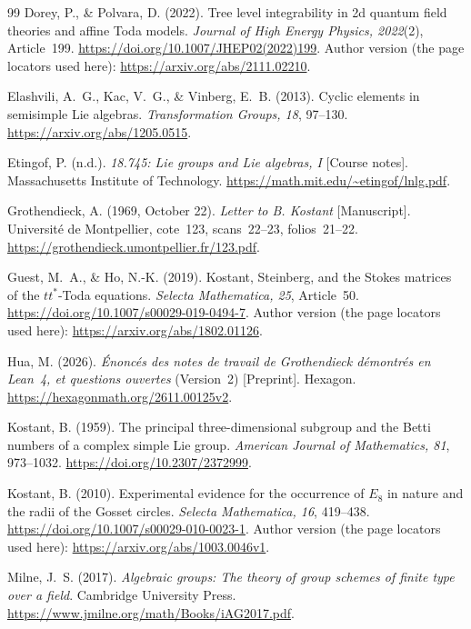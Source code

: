 \documentclass[11pt]{article}
\theoremstyle{definition}\newtheorem{definition}[theorem]{Definition}
\theoremstyle{remark}\newtheorem{remark}[theorem]{Remark}
\begin{document}
\begin{thebibliography}{99}
Dorey, P., \& Polvara, D. (2022). Tree level integrability in 2d quantum field theories and affine Toda models.
\emph{Journal of High Energy Physics, 2022}(2), Article~199.
\url{https://doi.org/10.1007/JHEP02(2022)199}.
Author version (the page locators used here): \url{https://arxiv.org/abs/2111.02210}.

Elashvili, A.~G., Kac, V.~G., \& Vinberg, E.~B. (2013).
Cyclic elements in semisimple Lie algebras.
\emph{Transformation Groups, 18}, 97--130.
\url{https://arxiv.org/abs/1205.0515}.

Etingof, P. (n.d.). \emph{18.745: Lie groups and Lie algebras, I} [Course notes]. Massachusetts Institute of Technology.
\url{https://math.mit.edu/~etingof/lnlg.pdf}.

Grothendieck, A. (1969, October 22). \emph{Letter to B. Kostant} [Manuscript]. Universit\'e de Montpellier, cote~123, scans~22--23, folios~21--22.
\url{https://grothendieck.umontpellier.fr/123.pdf}.

Guest, M.~A., \& Ho, N.-K. (2019). Kostant, Steinberg, and the Stokes matrices of the $tt^*$-Toda equations.
\emph{Selecta Mathematica, 25}, Article~50.
\url{https://doi.org/10.1007/s00029-019-0494-7}.
Author version (the page locators used here): \url{https://arxiv.org/abs/1802.01126}.

Hua, M. (2026). \emph{\'Enonc\'es des notes de travail de Grothendieck d\'emontr\'es en Lean~4, et questions ouvertes} (Version~2) [Preprint]. Hexagon.
\url{https://hexagonmath.org/2611.00125v2}.

Kostant, B. (1959). The principal three-dimensional subgroup and the Betti numbers of a complex simple Lie group.
\emph{American Journal of Mathematics, 81}, 973--1032.
\url{https://doi.org/10.2307/2372999}.

Kostant, B. (2010). Experimental evidence for the occurrence of $E_8$ in nature and the radii of the Gosset circles.
\emph{Selecta Mathematica, 16}, 419--438.
\url{https://doi.org/10.1007/s00029-010-0023-1}.
Author version (the page locators used here):
\url{https://arxiv.org/abs/1003.0046v1}.

Milne, J.~S. (2017). \emph{Algebraic groups: The theory of group schemes of finite type over a field}. Cambridge University Press.
\url{https://www.jmilne.org/math/Books/iAG2017.pdf}.


\end{thebibliography}
\end{document}
